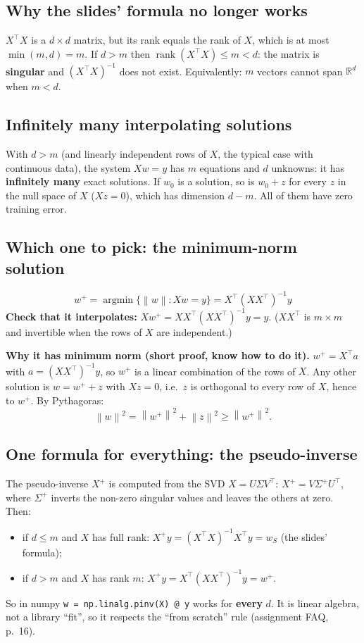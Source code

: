 \documentclass[11pt,a4paper]{article}
\newcommand{\R}{\mathbb{R}}
\newcommand{\norm}[1]{\left\lVert #1 \right\rVert}
\begin{document}
\subsection{Why the slides' formula no longer works}
$X^\top X$ is a $d \times d$ matrix, but its rank equals the rank of $X$, which is at most $\min(m,d) = m$.
If $d > m$ then $\operatorname{rank}(X^\top X) \le m < d$: the matrix is \textbf{singular} and $(X^\top X)^{-1}$ does not exist.
Equivalently: $m$ vectors cannot span $\R^d$ when $m < d$.

\subsection{Infinitely many interpolating solutions}
With $d > m$ (and linearly independent rows of $X$, the typical case with continuous data), the system $Xw = y$ has
$m$ equations and $d$ unknowns: it has \textbf{infinitely many} exact solutions. If $w_0$ is a solution, so is $w_0 + z$
for every $z$ in the null space of $X$ ($Xz = 0$), which has dimension $d - m$. All of them have zero training error.

\subsection{Which one to pick: the minimum-norm solution}
\[
  \boxed{w^{+} = \operatorname*{argmin}\bigl\{\norm{w} : Xw = y\bigr\} = X^\top (X X^\top)^{-1} y}
\]
\textbf{Check that it interpolates:} $Xw^{+} = XX^\top(XX^\top)^{-1}y = y$. ($XX^\top$ is $m\times m$ and invertible when
the rows of $X$ are independent.)

\textbf{Why it has minimum norm (short proof, know how to do it).}
$w^{+} = X^\top a$ with $a = (XX^\top)^{-1}y$, so $w^{+}$ is a linear combination of the rows of $X$.
Any other solution is $w = w^{+} + z$ with $Xz = 0$, i.e.\ $z$ is orthogonal to every row of $X$, hence to $w^{+}$.
By Pythagoras:
\[
  \norm{w}^2 = \norm{w^{+}}^2 + \norm{z}^2 \ge \norm{w^{+}}^2 .
\]

\subsection{One formula for everything: the pseudo-inverse}
The pseudo-inverse $X^{+}$ is computed from the SVD $X = U\Sigma V^\top$: $X^{+} = V\Sigma^{+}U^\top$, where $\Sigma^{+}$
inverts the non-zero singular values and leaves the others at zero. Then:
\begin{itemize}
  \item if $d \le m$ and $X$ has full rank: $X^{+}y = (X^\top X)^{-1}X^\top y = w_S$ (the slides' formula);
  \item if $d > m$ and $X$ has rank $m$: $X^{+}y = X^\top(XX^\top)^{-1}y = w^{+}$.
\end{itemize}
So in numpy \texttt{w = np.linalg.pinv(X) @ y} works for \textbf{every} $d$.
It is linear algebra, not a library ``fit'', so it respects the ``from scratch'' rule (assignment FAQ, p.~16).
\end{document}
